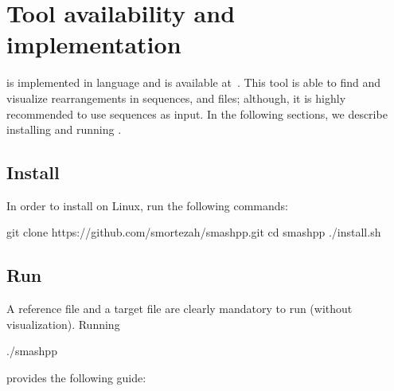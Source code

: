 \clearpage
\section{Tool availability and implementation}
\label{sec.tool}
\smashpp is implemented in \cpp language and is available at~\cite{web-smashpp}. This tool is able to find and visualize rearrangements in sequences, \fasta and \fastq files; although, it is highly recommended to use sequences as input. In the following sections, we describe installing and running \smashpp.

\subsection{Install}
In order to install \smashpp on Linux, run the following commands:
\begin{code}[style=bash]
  git clone https://github.com/smortezah/smashpp.git
  cd smashpp
  ./install.sh
\end{code}

\subsection{Run}
A reference file and a target file are clearly mandatory to run \smashpp (without visualization). Running
\begin{code}[style=bash]
  ./smashpp
\end{code}
provides the following guide:



